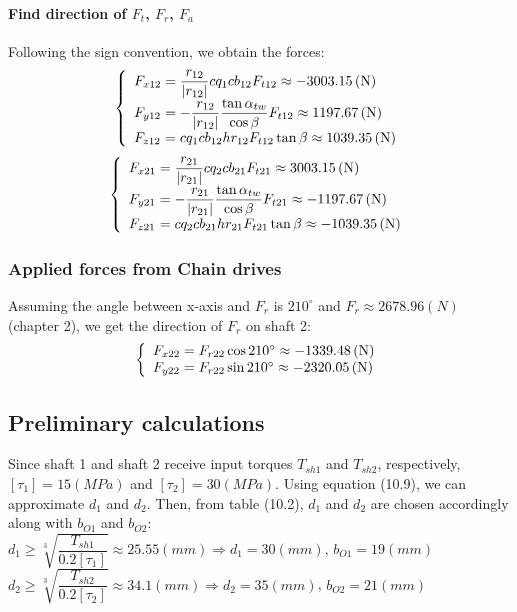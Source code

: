 \paragraph{Find direction of $ F_{t} $, $ F_r $, $ F_a $}
Following the sign convention, we obtain the forces:
\[
\left\{ 
\begin{array}{l@{{}={}}l}
F_{x12}& \dfrac{r_{12}}{|r_{12}|}cq_1cb_{12}F_{t12}\approx -3003.15 \unit{(N)}\\
F_{y12}& -\dfrac{r_{12}}{|r_{12}|}\dfrac{\tan\alpha_{tw}}{\cos\beta}F_{t12}\approx 1197.67 \unit{(N)}\\

F_{z12}& cq_1cb_{12}hr_{12}F_{t12}\tan\beta\approx 1039.35 \unit{(N)}\\ 
\end{array}
\right.
\]
\[
\left\{ 
\begin{array}{l@{{}={}}l}
F_{x21}& \dfrac{r_{21}}{|r_{21}|}cq_2cb_{21}F_{t21}\approx 3003.15 \unit{(N)}\\

F_{y21}& -\dfrac{r_{21}}{|r_{21}|}\dfrac{\tan\alpha_{tw}}{\cos\beta}F_{t21}\approx -1197.67 \unit{(N)}\\

F_{z21}& cq_2cb_{21}hr_{21}F_{t21}\tan\beta\approx -1039.35 \unit{(N)}\\ 
\end{array}
\right.
\]

\subsubsection{Applied forces from Chain drives}
Assuming the angle between x-axis and $ F_r $ is $ 210^\circ $ and $ F_r \approx 2678.96 \unit{(N)} $ (chapter 2), we get the direction of $ F_r $ on shaft 2:
\[
\left\{ 
\begin{array}{l@{{}={}}l}
F_{x22}& F_{r22}\cos210^\circ\approx -1339.48 \unit{(N)}\\

F_{y22}& F_{r22}\sin210^\circ\approx -2320.05 \unit{(N)}\\
\end{array}
\right.
\]

\subsection{Preliminary calculations}
Since shaft 1 and shaft 2 receive input torques $ T_{sh1} $ and $ T_{sh2} $, respectively, $ [\tau_1] = 15\unit{(MPa)}$ and $ [\tau_2]=30\unit{(MPa)} $. Using equation (10.9), we can approximate $ d_1 $ and $ d_2 $. Then, from table (10.2), $ d_1 $ and $ d_2 $ are chosen accordingly along with $ b_{O1} $ and $ b_{O2} $:\\
$ d_1 \geq \sqrt[3]{\dfrac{T_{sh1}}{0.2[\tau_1]}} \approx 25.55 \unit{(mm)}\Rightarrow d_1 = 30 \unit{(mm)}$, $ b_{O1} = 19 \unit{(mm)} $\\
$ d_2 \geq \sqrt[3]{\dfrac{T_{sh2}}{0.2[\tau_2]}} \approx 34.1 \unit{(mm)}\Rightarrow d_2 = 35\unit{(mm)}$, $ b_{O2} = 21 \unit{(mm)} $

